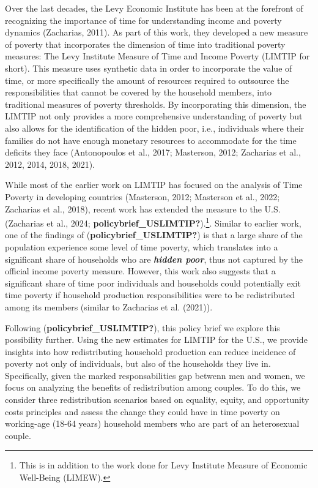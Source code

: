 \documentclass[
  11pt,
]{article}
\begin{document}
Over the last decades, the Levy Economic Institute has been at the
forefront of recognizing the importance of time for understanding income
and poverty dynamics (Zacharias, 2011). As part of this work, they
developed a new measure of poverty that incorporates the dimension of
time into traditional poverty measures: The Levy Institute Measure of
Time and Income Poverty (LIMTIP for short). This measure uses synthetic
data in order to incorporate the value of time, or more specifically the
amount of resources required to outsource the responsibilities that
cannot be covered by the household members, into traditional measures of
poverty thresholds. By incorporating this dimension, the LIMTIP not only
provides a more comprehensive understanding of poverty but also allows
for the identification of the hidden poor, i.e., individuals where their
families do not have enough monetary resources to accommodate for the
time deficits they face (Antonopoulos et al., 2017; Masterson, 2012;
Zacharias et al., 2012, 2014, 2018, 2021).

While most of the earlier work on LIMTIP has focused on the analysis of
Time Poverty in developing countries (Masterson, 2012; Masterson et al.,
2022; Zacharias et al., 2018), recent work has extended the measure to
the U.S. (Zacharias et al., 2024;
\textbf{policybrief\_USLIMTIP?}).\footnote{This is in addition to the
  work done for Levy Institute Measure of Economic Well-Being (LIMEW).}.
Similar to earlier work, one of the findings of
(\textbf{policybrief\_USLIMTIP?}) is that a large share of the
population experience some level of time poverty, which translates into
a significant share of households who are \textbf{\emph{hidden poor}},
thus not captured by the official income poverty measure. However, this
work also suggests that a significant share of time poor individuals and
households could potentially exit time poverty if household production
responsibilities were to be redistributed among its members (similar to
Zacharias et al. (2021)).

Following (\textbf{policybrief\_USLIMTIP?}), this policy brief we
explore this possibility further. Using the new estimates for LIMTIP for
the U.S., we provide insights into how redistributing household
production can reduce incidence of poverty not only of individuals, but
also of the households they live in. Specifically, given the marked
responsabilities gap betwenn men and women, we focus on analyzing the
benefits of redistribution among couples. To do this, we consider three
redistribution scenarios based on equality, equity, and opportunity
costs principles and assess the change they could have in time poverty
on working-age (18-64 years) household members who are part of an
heterosexual couple.
\end{document}
